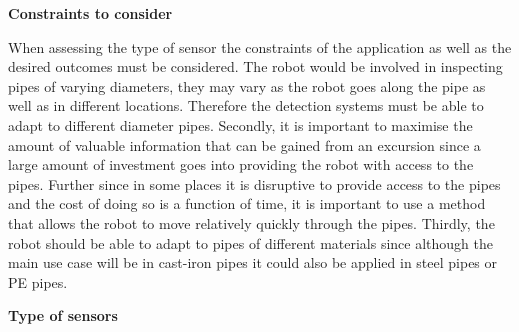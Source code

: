 \documentclass[11pt]{article}		%
\begin{document}
        \textbf{Constraints to consider}
        
        When assessing the type of sensor the constraints of the application as well as the desired outcomes must be considered. 
        The robot would be involved in inspecting pipes of varying diameters, they may vary as the robot goes along the pipe as well as in different locations. 
        Therefore the detection systems must be able to adapt to different diameter pipes. 
        Secondly, it is important to maximise the amount of valuable information that can be gained from an excursion since a large amount of investment goes into providing the robot with access to the pipes.
        Further since in some places it is disruptive to provide access to the pipes and the cost of doing so is a function of time, it is important to use a method that allows the robot to move relatively quickly through the pipes. 
        Thirdly, the robot should be able to adapt to pipes of different materials since although the main use case will be in cast-iron pipes it could also be applied in steel pipes or PE pipes.

        \textbf{Type of sensors}
        
\end{document}
